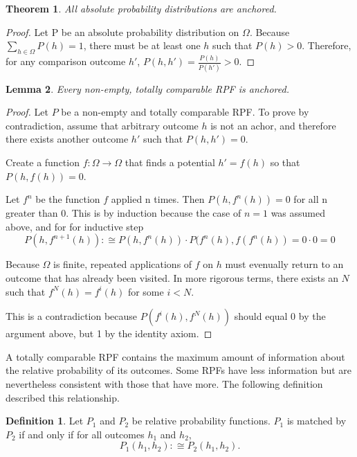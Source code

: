 \documentclass[twoside]{article}
\theoremstyle{plain}%
\newtheorem{theorem}{Theorem}[section]
\newtheorem{lemma}[theorem]{Lemma}
\theoremstyle{definition}
\newtheorem{definition}{Definition}[section]
\theoremstyle{remark}
\begin{document}
\begin{theorem}
\label{thm:absolute_anchored}
All absolute probability distributions are anchored.
\end{theorem}

\begin{proof}
Let P be an absolute probability distribution on \(\Omega\). Because \(\sum_{h \in \Omega} P(h) = 1\), there must be at least one \(h\) such that \(P(h) > 0\).  Therefore, for any comparison outcome \(h'\), \(P(h, h') = \frac{P(h)}{P(h')} > 0\).
\end{proof}

\begin{lemma}
\label{lemma:totally_comp_anchored}
Every non-empty, totally comparable RPF is anchored.
\end{lemma}

\begin{proof}
Let \(P\) be a non-empty and totally comparable RPF. To prove by contradiction, assume that arbitrary outcome \(h\) is not an achor, and therefore there exists another outcome \(h'\) such that \(P(h, h') = 0\).

Create a function \(f: \Omega \rightarrow \Omega\) that finds a potential \(h' = f(h)\) so that \(P(h, f(h)) = 0\).

Let \(f^n\) be the function \(f\) applied n times. Then \(P(h, f^n(h)) = 0\) for all n greater than 0. This is by induction because the case of \(n = 1\) was assumed above, and for for inductive step
\[P(h, f^{n+1}(h)) :\cong P(h, f^n(h)) \cdot P(f^n(h), f(f^n(h)) = 0 \cdot 0 = 0\]

Because \(\Omega\) is finite, repeated applications of \(f\) on \(h\) must evenually return to an outcome that has already been visited. In more rigorous terms, there exists an \(N\) such that \(f^N(h) = f^i(h)\) for some \(i < N\).

This is a contradiction because \(P(f^i(h), f^N(h))\) should equal 0 by the argument above, but 1 by the identity axiom.
\end{proof}

A totally comparable RPF contains the maximum amount of information about the relative probability of its outcomes. Some RPFs have less information but are nevertheless consistent with those that have more. The following definition described this relationship.

\begin{definition}
Let \(P_1\) and \(P_2\) be relative probability functions. \(P_1\) is matched by \(P_2\) if and only if for all outcomes \(h_1\) and \(h_2\),
\[P_1(h_1, h_2) :\cong P_2(h_1, h_2).\]
\end{definition}
\end{document}
